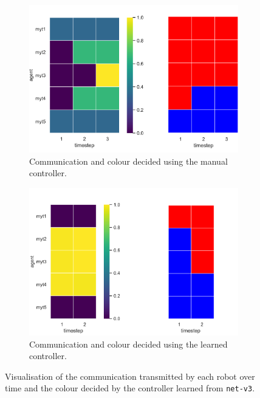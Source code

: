\begin{figure}[!htb]
	\begin{subfigure}[h]{\textwidth}
		\centering
		\includegraphics[width=.45\textwidth]{contents/images/net-v3/manual-0}
		\caption{Communication and colour decided using the manual controller.}
	\end{subfigure}
	\hspace*{\fill}%
	\vspace*{8pt}%
	\hspace*{\fill}%
	\begin{subfigure}[h]{\textwidth}
		\centering			
		\includegraphics[width=.45\textwidth]{contents/images/net-v3/learned-0}
		\caption{Communication and colour decided using the learned controller.}
	\end{subfigure}
	\caption[Evaluation of the communication learned by 
	\texttt{net-v3}.]{Visualisation of the communication transmitted by each 
		robot over time and the colour decided by the controller learned from 
		\texttt{net-v3}.}	
	\label{fig:net-v3commcolour}
\end{figure}

